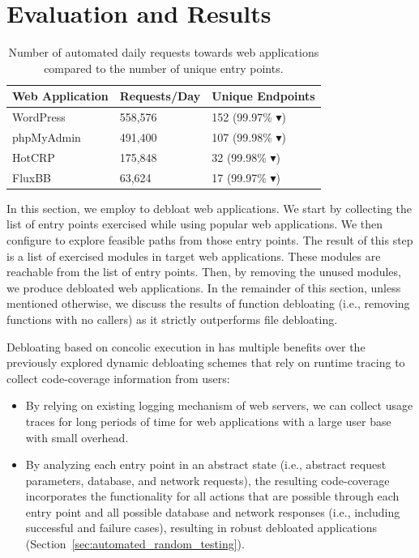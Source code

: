 \section{Evaluation and Results}
\label{sec:results}

\begin{table}[]
    \caption{Number of automated daily requests towards web applications compared to the number of unique entry points.}
    \centering
    \begin{tabular}{|l|l|l|}
    \hline
    \textbf{Web Application} & \textbf{Requests/Day} & \textbf{Unique Endpoints} \\ \hline
    WordPress                & 558,576               & 152 (99.97\% $\blacktriangledown$)             \\ \hline
    phpMyAdmin               & 491,400               & 107 (99.98\% $\blacktriangledown$)             \\ \hline
    HotCRP                   & 175,848                 & 32 (99.98\% $\blacktriangledown$)              \\ \hline
    FluxBB                   & 63,624                & 17 (99.97\% $\blacktriangledown$)              \\ \hline
    \end{tabular}
    \label{tab:logreduction}
\end{table}

In this section, we employ \animatedead{} to debloat web applications. 
We start by collecting the list of entry points exercised while using popular web applications. 
We then configure \animatedead{} to explore feasible paths from those entry points. 
The result of this step is a list of exercised modules in target web applications. 
These modules are reachable from the list of entry points. 
Then, by removing the unused modules, we produce debloated web applications. 
In the remainder of this section, unless mentioned otherwise, we discuss the results of function debloating (i.e., removing functions with no callers) as it strictly outperforms file debloating.

Debloating based on concolic execution in \animatedead{} has multiple benefits over the previously explored dynamic debloating schemes that rely on runtime tracing to collect code-coverage information from users:

\begin{itemize}
    \item By relying on existing logging mechanism of web servers, we can collect usage traces for long periods of time for web applications with a large user base with small overhead.
    \item By analyzing each entry point in an abstract state (i.e., abstract request parameters, database, and network requests), the resulting code-coverage incorporates the functionality for all actions that are possible through each entry point and all possible database and network responses (i.e., including successful and failure cases), resulting in robust debloated applications (Section~\ref{sec:automated_random_testing}). 
\end{itemize}

